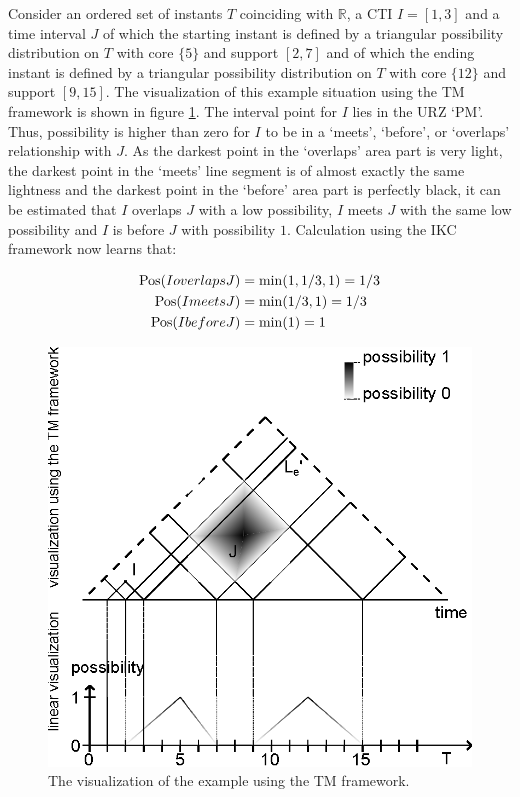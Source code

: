 \begin{example}
Consider an ordered set of instants $T$ coinciding with $\mathbb{R}$, a CTI $I = \left[1, 3\right]$ and a time interval $J$ of which the starting instant is defined by a triangular possibility distribution on $T$ with core $\{5\}$ and support $\left[2, 7\right]$ and of which the ending instant is defined by a triangular possibility distribution on $T$ with core $\{12\}$ and support $\left[9, 15\right]$. The visualization of this example situation using the TM framework is shown in figure \ref{fig:ex}. The interval point for $I$ lies in the URZ `PM'. Thus, possibility is higher than zero for $I$ to be in a `meets', `before', or `overlaps' relationship with $J$. As the darkest point in the `overlaps' area part is very light, the darkest point in the `meets' line segment is of almost exactly the same lightness and the darkest point in the `before' area part is perfectly black, it can be estimated that $I$ overlaps $J$ with a low possibility, $I$ meets $J$ with the same low possibility and $I$ is before $J$ with possibility $1$. Calculation using the IKC framework now learns that:

\begin{align}
\operatorname{Pos}(I overlaps J) & = \min(1, 1/3, 1) = 1/3 \nonumber \\
\operatorname{Pos}(I meets J) & = \min(1/3, 1) = 1/3\nonumber \\
\operatorname{Pos}(I before J) & = \min(1) = 1\nonumber
\end{align}

\end{example}

\begin{figure}[h]
	\centering
	\includegraphics[width=0.9\columnwidth]{graphs/example_image.eps}
	\caption{The visualization of the example using the TM framework.}
	\label{fig:ex}
\end{figure}
 
